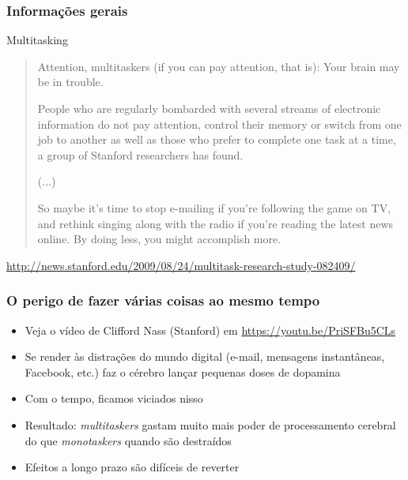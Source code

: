 \documentclass[Ligatures=TeX,table,brazil,svgnames,usetotalslideindicator,comp
ress,10pt]{beamer}
\begin{document}
\begin{frame}
  \frametitle{Informações gerais}

  \begin{block}{Multitasking}
    \begin{quotation}
      Attention, multitaskers (if you can pay attention, that is):
      Your brain may be in trouble.

      People who are regularly bombarded with several streams of
      electronic information do not pay attention, control their
      memory or switch from one job to another as well as those who
      prefer to complete one task at a time, a group of Stanford
      researchers has found.

      (...)

      So maybe it’s time to stop e-mailing if you’re following the
      game on TV, and rethink singing along with the radio if you’re
      reading the latest news online. By doing less, you might
      accomplish more.
    \end{quotation}
  \end{block}

  \begin{flushright}
    \tiny
    \url{http://news.stanford.edu/2009/08/24/multitask-research-study-082409/}
  \end{flushright}

\end{frame}

\begin{frame}
  \frametitle{O perigo de fazer várias coisas ao mesmo tempo}
  \begin{itemize}
  \item Veja o vídeo de Clifford Nass (Stanford) em \url{https://youtu.be/PriSFBu5CLs}
  \item Se render às distrações do mundo digital (e-mail, mensagens
    instantâneas, Facebook, etc.) faz o cérebro lançar pequenas doses
    de dopamina
  \item Com o tempo, ficamos viciados nisso
  \item Resultado: \textit{multitaskers} gastam muito mais poder de processamento cerebral do que \textit{monotaskers} quando são destraídos
  \item Efeitos a longo prazo são difíceis de reverter
  \end{itemize}
\end{frame}
\end{document}
